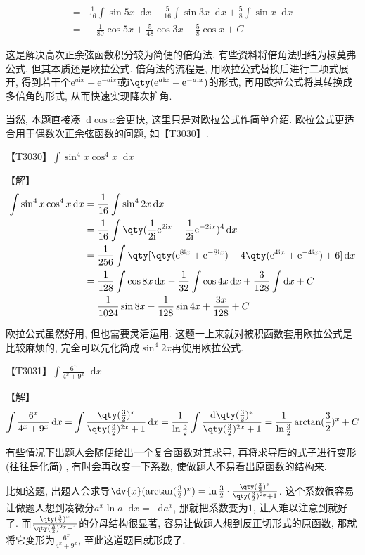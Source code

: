 \documentclass{ctexbook}
\newcommand{\e}{\mathrm{e}}
\newcommand{\im}{\mathrm{i}}
\newcommand*{\dif}{\mathop{}\!\mathrm{d}}
\begin{document}
{\begin{align*}
={}&\frac{1}{16}\int\sin{5x}\dif{x}-\frac{5}{16}\int\sin{3x}\dif{x}+\frac{5}{8}\int\sin{x}\dif{x}\\
={}&-\frac{1}{80}\cos{5x}+\frac{5}{48}\cos{3x}-\frac{5}{8}\cos{x}+C
\end{align*}\par
{\kaishu 这是解决高次正余弦函数积分较为简便的倍角法. 有些资料将倍角法归结为棣莫弗公式, 但其本质还是欧拉公式. 倍角法的流程是, 用欧拉公式替换后进行二项式展开, 得到若干个$\e^{a\im x}+\e^{-a\im x}$或$\im\qty(\e^{a\im x}-\e^{-a\im x})$的形式, 再用欧拉公式将其转换成多倍角的形式, 从而快速实现降次扩角. \par
当然, 本题直接凑$\dif{\cos{x}}$会更快, 这里只是对欧拉公式作简单介绍. 欧拉公式更适合用于偶数次正余弦函数的问题, 如{\color{red}【T3030】}. \par}
{\color{red}【T3030】}$\int\sin^{4}{x}\cos^{4}{x}\dif{x}$\par
【解】
\begin{align*}
\int\sin^{4}{x}\cos^{4}{x}\dif{x}={}&\frac{1}{16}\int\sin^{4}{2x}\dif{x}\\
={}&\frac{1}{16}\int\qty(\frac{1}{2\im}\e^{2\im x}-\frac{1}{2\im}\e^{-2\im x})^{4}\dif{x}\\
={}&\frac{1}{256}\int\qty[\qty(\e^{8\im x}+\e^{-8\im x})-4\qty(\e^{4\im x}+\e^{-4\im x})+6]\dif{x}\\
={}&\frac{1}{128}\int\cos{8x}\dif{x}-\frac{1}{32}\int\cos{4x}\dif{x}+\frac{3}{128}\int\dif{x}+C\\
={}&\frac{1}{1024}\sin{8x}-\frac{1}{128}\sin{4x}+\frac{3x}{128}+C
\end{align*}\par
{\kaishu 欧拉公式虽然好用, 但也需要灵活运用. 这题一上来就对被积函数套用欧拉公式是比较麻烦的, 完全可以先化简成$\sin^{4}{2x}$再使用欧拉公式. \par}
{\color{red}【T3031】}$\int\frac{6^{x}}{4^{x}+9^{x}}\dif{x}$\par
【解】
\begin{align*}
\int\frac{6^{x}}{4^{x}+9^{x}}\dif{x}=\int\frac{\qty(\frac{3}{2})^{x}}{\qty(\frac{3}{2})^{2x}+1}\dif{x}
=\frac{1}{\ln\frac{3}{2}}\int\frac{\dif{\qty(\frac{3}{2})^{x}}}{\qty(\frac{3}{2})^{2x}+1}
=\frac{1}{\ln\frac{3}{2}}\arctan(\frac{3}{2})^{x}+C
\end{align*}\par
{\kaishu 有些情况下出题人会随便给出一个复合函数对其求导, 再将求导后的式子进行变形 (往往是化简) , 有时会再改变一下系数, 使做题人不易看出原函数的结构来. \par
比如这题, 出题人会求导$\dv{x}(\arctan(\frac{3}{2})^{x})=\ln{\frac{3}{2}}\cdot\frac{\qty(\frac{3}{2})^{x}}{\qty(\frac{3}{2})^{2x}+1}$. 这个系数很容易让做题人想到凑微分$a^{x}\ln{a}\dif{x}=\dif{a^{x}}$, 那就把系数变为$1$, 让人难以注意到就好了. 而$\frac{\qty(\frac{3}{2})^{x}}{\qty(\frac{3}{2})^{2x}+1}$的分母结构很显著, 容易让做题人想到反正切形式的原函数, 那就将它变形为$\frac{6^{x}}{4^{x}+9^{x}}$, 至此这道题目就形成了. \par
}}
\end{document}
